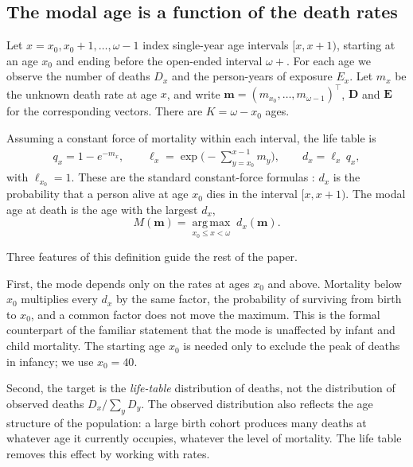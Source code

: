 \documentclass[12pt, letterpaper]{article}
\begin{document}
\subsection{The modal age is a function of the death rates}
\label{sec:target}

Let $x = x_0, x_0+1, \dots, \omega-1$ index single-year age intervals $[x, x+1)$, starting at an age $x_0$ and ending before the open-ended interval $\omega+$. For each age we observe the number of deaths $D_x$ and the person-years of exposure $E_x$. Let $m_x$ be the unknown death rate at age $x$, and write $\bm{m} = (m_{x_0}, \dots, m_{\omega-1})^\top$, $\bm{D}$ and $\bm{E}$ for the corresponding vectors. There are $K = \omega - x_0$ ages.

Assuming a constant force of mortality within each interval, the life table is
\begin{equation}
\begin{aligned}
q_x = 1 - e^{-m_x}, \qquad
\ell_x = \exp\Big(-\sum_{y=x_0}^{x-1} m_y\Big), \qquad
d_x = \ell_x \, q_x ,
\end{aligned}
\label{eq:lifetable}
\end{equation}
with $\ell_{x_0} = 1$. These are the standard constant-force formulas \citep{preston2000demography}: $d_x$ is the probability that a person alive at age $x_0$ dies in the interval $[x, x+1)$. The modal age at death is the age with the largest $d_x$,
\begin{equation}
M(\bm{m}) = \operatorname*{arg\,max}_{x_0 \le x < \omega} \; d_x(\bm{m}).
\label{eq:mode_def}
\end{equation}

Three features of this definition guide the rest of the paper.

First, the mode depends only on the rates at ages $x_0$ and above. Mortality below $x_0$ multiplies every $d_x$ by the same factor, the probability of surviving from birth to $x_0$, and a common factor does not move the maximum. This is the formal counterpart of the familiar statement that the mode is unaffected by infant and child mortality. The starting age $x_0$ is needed only to exclude the peak of deaths in infancy; we use $x_0 = 40$.

Second, the target is the \emph{life-table} distribution of deaths, not the distribution of observed deaths $D_x / \sum_y D_y$. The observed distribution also reflects the age structure of the population: a large birth cohort produces many deaths at whatever age it currently occupies, whatever the level of mortality. The life table removes this effect by working with rates.
\end{document}
